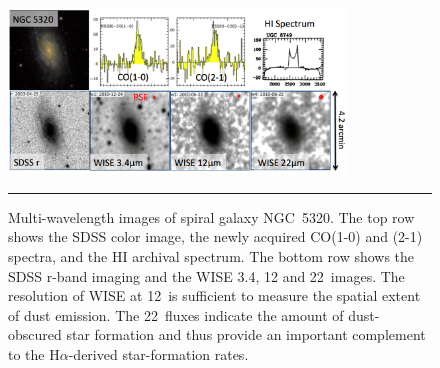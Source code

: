 \documentclass[11pt, preprint]{aastex}
\newcommand{\ha}{H$\alpha$}
\newcommand{\sers}{{\it S\'{e}rsic}}
\begin{document}
{\begin{figure}[h]
\centering
\includegraphics[width=0.8\textwidth]{NGC5320multiwaveV2.png}
\caption{\small 
Multi-wavelength images of spiral galaxy NGC~5320.  The top row shows
the SDSS color image, the newly acquired CO(1-0) and (2-1) spectra,
and the HI archival spectrum.  The bottom row shows the SDSS r-band
imaging and the WISE 3.4, 12 and 22\micron \ images. The resolution of WISE at 12\micron\ is
sufficient to measure the spatial extent of dust emission.  The 22\micron \ fluxes indicate the amount of
dust-obscured star formation and thus provide an important complement
to the \ha-derived star-formation rates.
}
\label{wiseCO}
\hrule
\vspace{-0.5cm}
\end{figure}




}
\end{document}
